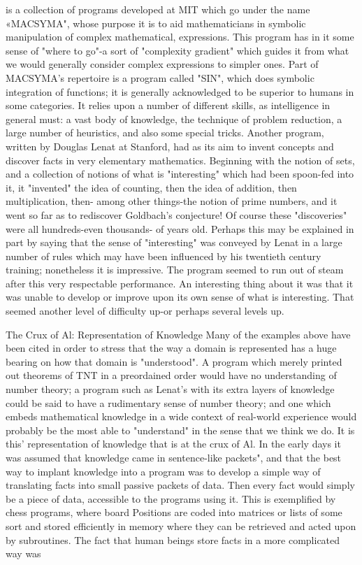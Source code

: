 {is a collection of programs developed at MIT which go under the name «MACSYMA",
whose purpose it is to aid mathematicians in symbolic manipulation of complex
mathematical, expressions. This program has in it some sense of "where to go"-a sort of
"complexity gradient" which guides it from what we would generally consider complex
expressions to simpler ones. Part of MACSYMA's repertoire is a program called "SIN",
which does symbolic integration of functions; it is generally acknowledged to be superior
to humans in some categories. It relies upon a number of different skills, as intelligence
in general must: a vast body of knowledge, the technique of problem reduction, a large
number of heuristics, and also some special tricks.
          Another program, written by Douglas Lenat at Stanford, had as its aim to invent
concepts and discover facts in very elementary mathematics. Beginning with the notion
of sets, and a collection of notions of what is "interesting" which had been spoon-fed into
it, it "invented" the idea of counting, then the idea of addition, then multiplication, then-
among other things-the notion of prime numbers, and it went so far as to rediscover
Goldbach's conjecture! Of course these "discoveries" were all hundreds-even thousands-
of years old. Perhaps this may be explained in part by saying that the sense of
"interesting" was conveyed by Lenat in a large number of rules which may have been
influenced by his twentieth century training; nonetheless it is impressive. The program
seemed to run out of steam after this very respectable performance. An interesting thing
about it was that it was unable to develop or improve upon its own sense of what is
interesting. That seemed another level of difficulty up-or perhaps several levels up.

                The Crux of Al: Representation of Knowledge
Many of the examples above have been cited in order to stress that the way a domain is
represented has a huge bearing on how that domain is "understood". A program which
merely printed out theorems of TNT in a preordained order would have no understanding
of number theory; a program such as Lenat's with its extra layers of knowledge could be
said to have a rudimentary sense of number theory; and one which embeds mathematical
knowledge in a wide context of real-world experience would probably be the most able to
"understand" in the sense that we think we do. It is this' representation of knowledge that
is at the crux of Al.
         In the early days it was assumed that knowledge came in sentence-like packets",
and that the best way to implant knowledge into a program was to develop a simple way
of translating facts into small passive packets of data. Then every fact would simply be a
piece of data, accessible to the programs using it. This is exemplified by chess programs,
where board Positions are coded into matrices or lists of some sort and stored efficiently
in memory where they can be retrieved and acted upon by subroutines.
         The fact that human beings store facts in a more complicated way was




}
